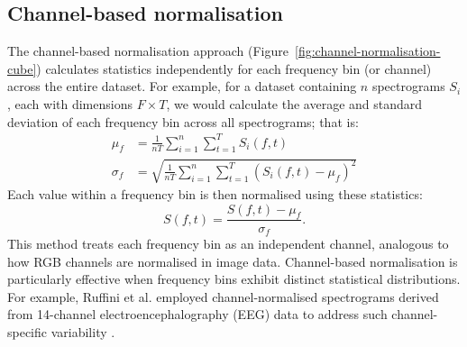 \subsection{Channel-based normalisation}
The channel-based normalisation approach (Figure~\ref{fig:channel-normalisation-cube}) calculates statistics independently for each frequency bin (or channel) across the entire dataset. For example, for a dataset containing $n$ spectrograms $S_i$, each with dimensions $F \times T$, we would calculate the average and standard deviation of each frequency bin across all spectrograms; that is:
\begin{align}
    \mu_f &= \frac{1}{nT} \sum_{i=1}^n \sum_{t=1}^T S_i(f, t) \\
    \sigma_f &= \sqrt{\frac{1}{nT} \sum_{i=1}^n \sum_{t=1}^T \left(S_i(f, t) - \mu_f\right)^2}
\end{align}
Each value within a frequency bin is then normalised using these statistics:
\begin{equation}
    S(f,t) = \frac{S(f,t) - \mu_f}{\sigma_f}.
\end{equation}
This method treats each frequency bin as an independent channel, analogous to how RGB channels are normalised in image data. Channel-based normalisation is particularly effective when frequency bins exhibit distinct statistical distributions. For example, Ruffini et al. employed channel-normalised spectrograms derived from 14-channel electroencephalography (EEG) data to address such channel-specific variability \cite{ruffini_deep_2019}.

